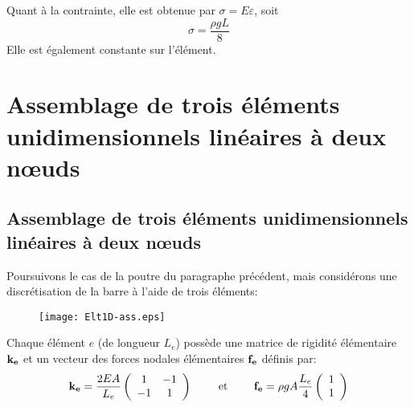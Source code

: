 Quant à la contrainte, elle est obtenue par $\sigma=E\varepsilon$, soit
\begin{equation}\sigma=\frac{\rho g L}8\end{equation} Elle est également constante sur l'élément.


\medskip
\ifVersionAvecExemplesSepares
   \section{Assemblage de trois éléments unidimensionnels linéaires à deux nœuds}\label{Sec-ass}
\else
   \subsection{Assemblage de trois éléments unidimensionnels linéaires à deux nœuds}\label{Sec-ass}
\fi

Poursuivons le cas de la poutre du paragraphe précédent, mais considérons une discrétisation
de la barre à l'aide de trois éléments:
\begin{figure}[ht]\centering
\texttt{[image: Elt1D-ass.eps]}
\end{figure}

\medskip
Chaque élément $e$ (de longueur $L_e$) possède une matrice de rigidité élémentaire $\mathbf{k_e}$ 
et un vecteur des forces nodales élémentaires $\mathbf{f_e}$ définis par:
\begin{equation}
\mathbf{k_e} = \frac{2EA}{L_e} \left(  \begin{array}{cc} 1 & -1\\ -1& 1 \end{array}\right)
\qquad \text{ et } \qquad
\mathbf{f_e} = \rho g A \frac{L_e}4 \left(  \begin{array}{c} 1 \\1 \end{array}\right)
\end{equation}

